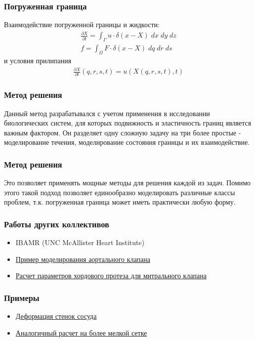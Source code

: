 \documentclass[14pt]{beamer}
\begin{document}
\begin{frame}
\frametitle{Погруженная граница}
Взаимодействие погруженной границы и жидкости:
\begin{gather}
    \label{eq:ibm_velocity}
    \frac{\partial X}{\partial t} = \int_{\Gamma} u \cdot \delta (x - X)\; dx\; dy\; dz \\
    \label{eq:ibm_force}
    f = \int_{\Omega} F \cdot \delta (x - X)\; dq\; dr\; ds
\end{gather}
и условия прилипания
\begin{gather}
    \label{eq:no_slip}
    \frac{\partial X}{\partial t} (q, r, s, t) = u(X(q, r, s, t), t)
\end{gather}
\end{frame}

\begin{frame}
\frametitle{Метод решения}
Данный метод разрабатывался с учетом применения в исследовании биологических систем, для которых подвижность и эластичность границ является важным фактором.
Он разделяет одну сложную задачу на три более простые - моделирование течения, моделирование состояния границы и их взаимодействие.
\end{frame}

\begin{frame}
\frametitle{Метод решения}
Это позволяет применять мощные методы для решения каждой из задач. Помимо этого такой подход позволяет единообразно моделировать различные классы проблем, т.к. погруженная граница может иметь практически любую форму.
\end{frame}

\begin{frame}
\frametitle{Работы других коллективов}
\begin{itemize}
    \item IBAMR (UNC McAllister Heart Institute)
    \item \href{run:video/valve\_flow\_side.mov}{Пример моделирования аортального клапана}
    \item \href{run:video/MV\_side.mov}{Расчет параметров хордового протеза для митрального клапана}
\end{itemize}
\end{frame}

\begin{frame}
\frametitle{Примеры}
\begin{itemize}
    \item \href{run:video/cylinder1.ogv}{Деформация стенок сосуда}
    \item \href{run:video/cylinder2.ogv}{Аналогичный расчет на более мелкой сетке}
\end{itemize}
\end{frame}
\end{document}
